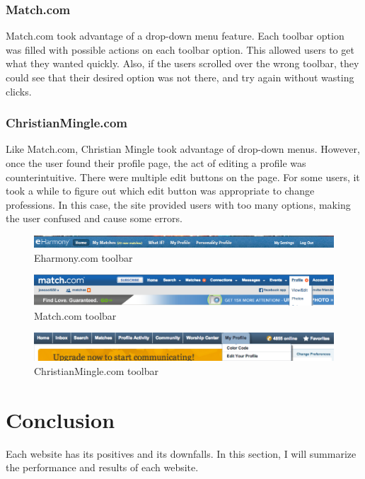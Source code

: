 \documentclass{article}
\begin{document}
\subsubsection{Match.com}
Match.com took advantage of a drop-down menu feature. Each toolbar option was filled with possible actions on each toolbar option. This allowed users to get what they wanted quickly. Also, if the users scrolled over the wrong toolbar, they could see that their desired option was not there, and try again without wasting clicks. 

\subsubsection{ChristianMingle.com}
Like Match.com, Christian Mingle took advantage of drop-down menus. However, once the user found their profile page, the act of editing a profile was counterintuitive. There were multiple edit buttons on the page. For some users, it took a while to figure out which edit button was appropriate to change professions. In this case, the site provided users with too many options, making the user confused and cause some errors. 

\begin{figure}
\centering
\includegraphics[width=7in]{Eharm3.png} 

\caption{Eharmony.com toolbar}
\label{Eharm3}
\end{figure}

\begin{figure}
\centering
\includegraphics[width=7in]{Match3.png} 

\caption{Match.com toolbar}
\label{Match3}
\end{figure}

\begin{figure}
\centering
\includegraphics[width=7in]{CM3.png} 

\caption{ChristianMingle.com toolbar}
\label{CM3}
\end{figure}

\section{Conclusion}
Each website has its positives and its downfalls. In this section, I will summarize the performance and results of each website.
\end{document}
